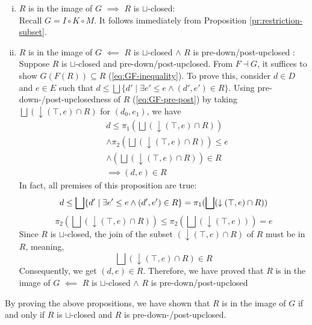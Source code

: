 \documentclass{llncs}
\newcommand{\join}{\sqcup}
\newcommand{\bigjoin}{\bigsqcup}
\newcommand{\comp}{\circ}
\begin{document}
\begin{enumerate}[i.]
\item{$R$ is in the image of $G$ $\implies$ $R$ is $\join$-closed:}\\
  Recall $G = I \comp K \comp M$. It follows immediately from Proposition \ref{pr:restriction-subset}.
\item{$R$ is in the image of $G$ $\impliedby$ $R$ is $\join$-closed $\land$ $R$ is pre-down/post-upclosed :}\\
  Suppose $R$ is $\join$-closed and pre-down/post-upclosed.
  From $F \dashv G$, it suffices to show $G(F(R)) \subseteq R$ (\ref{eq:GF-inequality}).
  To prove this, consider $d \in D$ and $e \in E$ such that $d \leq \bigjoin \{d' \mid \exists e' \leq e \land (d' , e') \in R \}$.
  Using pre-down-/post-upclosedness of $R$ (\ref{eq:GF-pre-post}) by taking $\bigjoin (\downarrow (\top , e) \cap R)$ for $(d_0 , e_1)$, we have
  \begin{align*}
    &d \leq \pi_{1} (\bigjoin (\downarrow (\top , e) \cap R)) \\
    &\land \pi_{2} (\bigjoin (\downarrow (\top , e) \cap R)) \leq e\\
    &\land (\bigjoin (\downarrow (\top , e) \cap R)) \in R\\
    &\implies (d, e) \in R
  \end{align*}
  In fact, all premises of this proposition are true:
  \begin{equation}
     d \leq \bigjoin \{d' \mid \exists e' \leq e \land (d' , e') \in R \} = \pi_{1} (\bigjoin (\downarrow (\top , e) \cap R)) \\
  \end{equation}
  \begin{equation}
     \pi_{2} (\bigjoin (\downarrow (\top , e) \cap R)) \leq \pi_{2} (\bigjoin (\downarrow (\top , e))) = e
  \end{equation}
   Since $R$ is $\join$-closed, the join of the subset $(\downarrow (\top , e) \cap R)$ of $R$ must be in $R$, meaning,
  \begin{equation*} \bigjoin (\downarrow (\top , e) \cap R) \in R
  \end{equation*}
  Consequently, we get $(d, e) \in R$.
  Therefore, we have proved that $R$ is in the image of $G$ $\impliedby$ $R$ is $\join$-closed $\land$ $R$ is pre-down/post-upclosed
\end{enumerate}
By proving the above propositions, we have shown that $R$ is in the image of $G$ if and only if $R$ is $\join$-closed and $R$ is pre-down-/post-upclosed.
\end{document}
